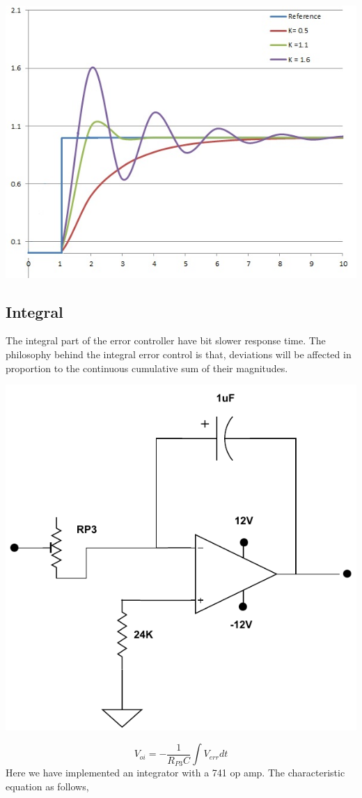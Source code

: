 \begin{multicols}{2}
\begin{minipage}{0.45\textwidth}
\centering
\includegraphics[width=\textwidth]{PID/PID_varyingP.jpg}
\end{minipage}

\subsection{Integral}
The integral part of the error controller have bit slower response time. The philosophy behind the integral error control is that, deviations will be affected in proportion to the continuous cumulative sum of their magnitudes.
\begin{minipage}{0.45\textwidth}
\centering
\includegraphics[width=\textwidth]{PID/I.pdf}
\end{minipage}
$$V_{oi}=- \frac{1}{R_{P3} C} \int V_{err} d t  $$
Here we have implemented an integrator with a 741 op amp. The characteristic equation as follows,


\end{multicols}
